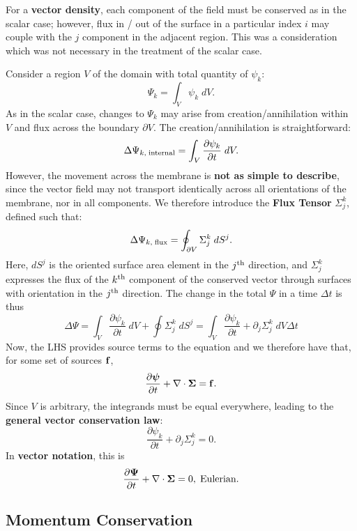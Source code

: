\begin{remark}
    For a \textbf{vector density}, each component of the field must be conserved as in the scalar case; however, flux in / out of the surface in a particular index $i$ may couple with the $j$ component in the adjacent region. This was a consideration which was not necessary in the treatment of the scalar case.
\end{remark}

Consider a region $V$ of the domain with total quantity of $\psi_k$:
\[
\Psi_k = \int_V \psi_k \; dV.
\]
As in the scalar case, changes to $\Psi_k$ may arise from creation/annihilation within $V$ and flux across the boundary $\partial V$. The creation/annihilation is straightforward:
\[
\Delta \Psi_{k,\;{\rm internal}} = \int_V \frac{\partial \psi_k}{\partial t} \; dV.
\]
However, the movement across the membrane is \textbf{not as simple to describe}, since the vector field may not transport identically across all orientations of the membrane, nor in all components. We therefore introduce the \textbf{Flux Tensor} $\Sigma^k_j$, defined such that:
\[
\Delta \Psi_{k,\;{\rm flux}} = \oint_{\partial V} \Sigma^k_j \; dS^j.
\]
Here, $dS^j$ is the oriented surface area element in the $j^{\rm th}$ direction, and $\Sigma^k_j$ expresses the flux of the $k^{\rm th}$ component of the conserved vector through surfaces with orientation in the $j^{\rm th}$ direction. The change in the total $\Psi$ in a time $\Delta t$ is thus
\[
\Delta \Psi = \int_V \frac{\partial \psi_k}{\partial t} \; dV + \oint \Sigma_j^k \;dS^j = \int_V \frac{\partial \psi_k}{\partial t} + \partial_j\Sigma_j^k\; dV \Delta t
\]
Now, the LHS provides source terms to the equation and we therefore have that, for some set of sources ${\bf f}$,
\[
\frac{\partial \boldsymbol{\psi}}{\partial t} + \nabla \cdot \boldsymbol{\Sigma} = {\bf f}.
\]
Since $V$ is arbitrary, the integrands must be equal everywhere, leading to the \textbf{general vector conservation law}:
\begin{equation}
\boxed{
\frac{\partial \psi_k}{\partial t} + \partial_j \Sigma^k_j = 0.
}
\end{equation}
In \textbf{vector notation}, this is
\[
\frac{\partial{\bf \Psi}}{\partial t} + \nabla \cdot {\bf \Sigma} = 0,\;\text{Eulerian.}
\]

\subsection{Momentum Conservation}

